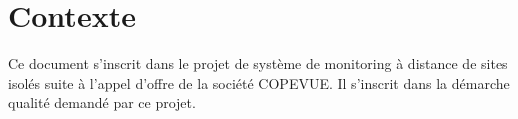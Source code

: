 \section{Contexte}

Ce document s'inscrit dans le projet de système de monitoring à distance de 
sites isolés suite à l'appel d'offre de la société COPEVUE.
Il s'inscrit dans la démarche qualité demandé par ce projet.
